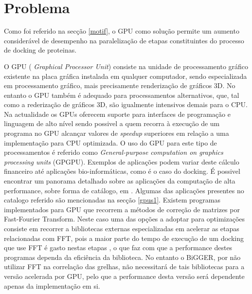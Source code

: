 \section{Problema}
%
%
 Como foi referido na secção \ref{motif}, o GPU como solução permite um aumento considerável de desempenho na paralelização de etapas constituintes do processo de docking de proteinas. \par
O GPU ( \textit{Graphical Processor Unit}) consiste na unidade de processamento gráfico existente na placa gráfica instalada em qualquer computador, sendo especializada em processamento gráfico, mais precisamente renderização de gráficos 3D.
 No entanto o GPU também é adequado para processamentos alternativos, que, tal como a rederização de gráficos 3D, são igualmente intensivos demais para o CPU. Na actualidade os GPUs oferecem suporte para interfaces de programação e linguagem de alto nível sendo possivel a quem recorra à execução de um programa no GPU alcançar valores de \textit{speedup} superiores em relação a uma implementação para CPU optimizada. O uso do GPU para este tipo de processamentos é referido como \textit{General-purpose computation on graphics processing units} (GPGPU)\cite{gpgpu}. Exemplos de aplicações podem variar deste cálculo financeiro até aplicações bio-informáticas, como é o caso do docking. É possivel encontrar um panorama detalhado sobre as aplicações da computação de alta performance, sobre forma de catálogo, em \cite{cudaIntro}. Algumas das aplicações presentes no catalogo referido são mencionadas na secção \ref{gpus1}. 
 Existem programas implementados para GPU que recorrem a métodos de correção de matrizes por Fast-Fourier Transform. Neste caso uma das opções a adoptar para optimizações consiste em recorrer a bibliotecas externas especializadas em acelerar as etapas relacionadas com FFT, pois a maior parte do tempo de execução de um docking que use FFT é gasto nestas etapas\cite{piper2014gpu} \cite{shimoda2015protein}, o que faz com que a performance destes programas dependa da eficiência da biblioteca. No entanto o BiGGER, por não utilizar FFT na correlação das grelhas, não necessitará de tais bibliotecas para a versão acelerada por GPU, pelo que a performance desta versão será dependente apenas da implementação em si.
%


